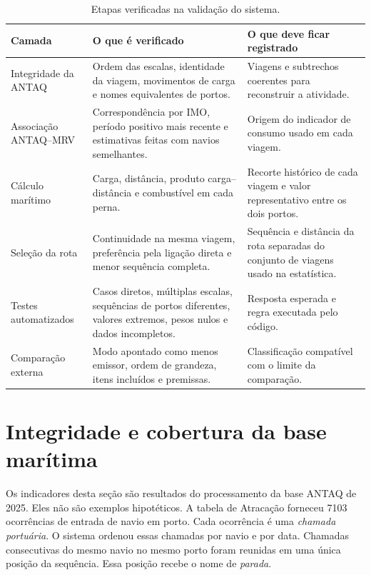 \begin{table}[htbp]
\centering
\small
\caption{Etapas verificadas na validação do sistema.}
\label{tab:camadas-validacao}
\begin{tabularx}{\textwidth}{L{0.27\textwidth}Y Y}
\toprule
Camada & O que é verificado & O que deve ficar registrado \\
\midrule
Integridade da ANTAQ & Ordem das escalas, identidade da viagem, movimentos de carga e nomes equivalentes de portos. & Viagens e subtrechos coerentes para reconstruir a atividade.\\
Associação ANTAQ--MRV & Correspondência por IMO, período positivo mais recente e estimativas feitas com navios semelhantes. & Origem do indicador de consumo usado em cada viagem.\\
Cálculo marítimo & Carga, distância, produto carga--distância e combustível em cada perna. & Recorte histórico de cada viagem e valor representativo entre os dois portos.\\
Seleção da rota & Continuidade na mesma viagem, preferência pela ligação direta e menor sequência completa. & Sequência e distância da rota separadas do conjunto de viagens usado na estatística.\\
Testes automatizados & Casos diretos, múltiplas escalas, sequências de portos diferentes, valores extremos, pesos nulos e dados incompletos. & Resposta esperada e regra executada pelo código.\\
Comparação externa & Modo apontado como menos emissor, ordem de grandeza, itens incluídos e premissas. & Classificação compatível com o limite da comparação.\\
\bottomrule
\end{tabularx}
\end{table}

\section{Integridade e cobertura da base marítima}
\label{sec:validacao-base-maritima}

Os indicadores desta seção são resultados do processamento da base ANTAQ de 2025. Eles não são exemplos hipotéticos. A tabela de Atracação forneceu \num{7103} ocorrências de entrada de navio em porto. Cada ocorrência é uma \emph{chamada portuária}. O sistema ordenou essas chamadas por navio e por data. Chamadas consecutivas do mesmo navio no mesmo porto foram reunidas em uma única posição da sequência. Essa posição recebe o nome de \emph{parada}.

